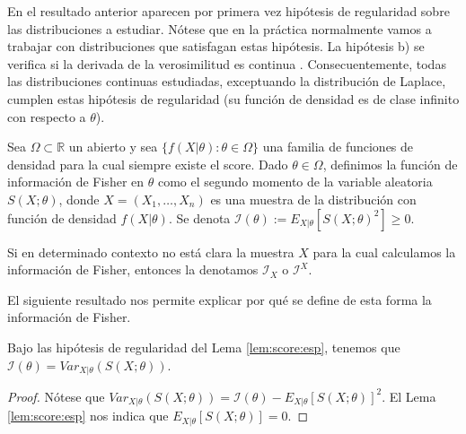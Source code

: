 \documentclass{article}
\begin{document}
    En el resultado anterior aparecen por primera vez hipótesis de regularidad sobre las distribuciones a estudiar. Nótese que en la práctica normalmente vamos a trabajar con distribuciones que satisfagan estas hipótesis. La hipótesis b) se verifica si la derivada de la verosimilitud es continua \cite{leibniz}. Consecuentemente, todas las distribuciones continuas estudiadas, exceptuando la distribución de Laplace, cumplen estas hipótesis de regularidad (su función de densidad es de clase infinito con respecto a $\theta$).

    \begin{definition}
        Sea $\Omega \subset \mathbb{R}$ un abierto y sea $\{f(X|\theta): \theta \in \Omega\}$ una familia de funciones de densidad para la cual siempre existe el score. Dado $\theta \in \Omega$, definimos la función de información de Fisher en $\theta$ como el segundo momento de la variable aleatoria $S(X;\theta)$, donde $X = (X_1, \ldots, X_n)$ es una muestra de la distribución con función de densidad $f(X|\theta)$. Se denota $\mathcal{I}(\theta) := E_{X|\theta}[S(X;\theta)^2] \ge 0.$
    \end{definition}

    Si en determinado contexto no está clara la muestra $X$ para la cual calculamos la información de Fisher, entonces la denotamos $\mathcal{I}_X$ o $\mathcal{I}^X$.

    El siguiente resultado nos permite explicar por qué se define de esta forma la información de Fisher.

    \begin{cor}
        Bajo las hipótesis de regularidad del Lema \ref{lem:score:esp}, tenemos que  $\mathcal{I}(\theta) = Var_{X|\theta}(S(X;\theta))$.
    \end{cor}
    \begin{proof}
        Nótese que $Var_{X|\theta}(S(X;\theta)) = \mathcal{I}(\theta) - E_{X|\theta}[S(X; \theta)]^2$. El Lema \ref{lem:score:esp} nos indica que $E_{X|\theta}[S(X; \theta)] = 0$.
    \end{proof}
\end{document}
